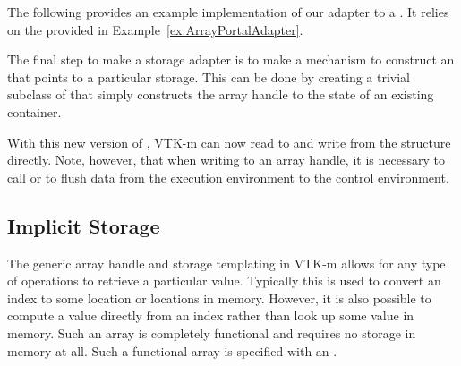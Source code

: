 The following provides an example implementation of our adapter to a
. It relies on the
 provided in
Example~\ref{ex:ArrayPortalAdapter}.


The final step to make a storage adapter is to make a mechanism to
construct an  that points to a particular
storage. This can be done by creating a trivial subclass of
 that simply constructs the array handle to the state
of an existing container.


With this new version of , VTK-m can now read
to and write from the  structure directly. Note,
however, that when writing to an array handle, it is necessary to call
 or  to flush
data from the execution environment to the control environment. 




\subsection{Implicit Storage}


The generic array handle and storage templating in VTK-m allows for
any type of operations to retrieve a particular value. Typically this is
used to convert an index to some location or locations in memory. However,
it is also possible to compute a value directly from an index rather than
look up some value in memory. Such an array is completely functional and
requires no storage in memory at all. Such a functional array is specified
with an .

